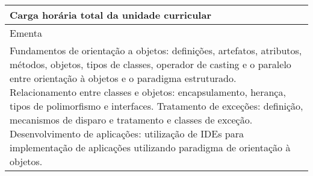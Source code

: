 \begin{quadro}[ht!]
\begin{tabular}{|p{3cm} p{2cm} p{3cm} p{2cm} p{3cm} p{2cm}|}
\multicolumn{5}{|p{13cm}|}{\cellcolor{blue1} Carga horária total da unidade curricular} & \multicolumn{1}{p{1cm}|}{\raggedleft 90	}\\\hline
\multicolumn{6}{|p{15cm}|}{\cellcolor{blue1} Ementa} \\\hline
\hline\multicolumn{6}{|p{15cm}|}{\scriptsize Fundamentos de orientação a objetos: definições, artefatos, atributos, métodos, objetos, tipos de classes, operador de casting e o paralelo entre orientação à objetos e o paradigma estruturado. Relacionamento entre classes e objetos: encapsulamento, herança, tipos de polimorfismo e interfaces. Tratamento de exceções: definição, mecanismos de disparo e tratamento e classes de exceção. Desenvolvimento de aplicações: utilização de IDEs para implementação de aplicações utilizando paradigma de orientação à objetos.}\\\hline
\hline
	\end{tabular}
\end{quadro}
\clearpage

